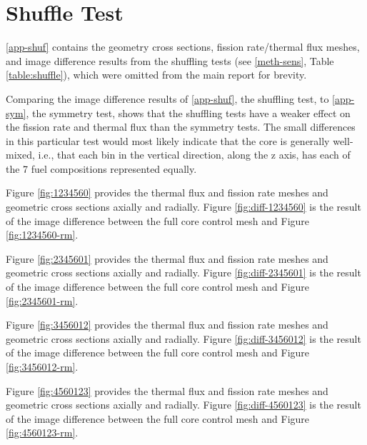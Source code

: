 \section{Shuffle Test}
\label{app-shuf}
\autoref{app-shuf} contains the geometry cross sections, fission rate/thermal flux meshes, and image difference results from the shuffling tests (see \autoref{meth-sens}, Table \ref{table:shuffle}), which were omitted from the main report for brevity.

Comparing the image difference results of \autoref{app-shuf}, the shuffling test, to \autoref{app-sym}, the symmetry test, shows that the shuffling tests have a weaker effect on the fission rate and thermal flux than the symmetry tests.  The small differences in this particular test would most likely indicate that the core is generally well-mixed, i.e., that each bin in the vertical direction, along the z axis, has each of the 7 fuel compositions represented equally.





Figure \ref{fig:1234560} provides the thermal flux and fission rate meshes and geometric cross sections axially and radially.  Figure \ref{fig:diff-1234560} is the result of the image difference between the full core control mesh and Figure \ref{fig:1234560-rm}.




Figure \ref{fig:2345601} provides the thermal flux and fission rate meshes and geometric cross sections axially and radially.  Figure \ref{fig:diff-2345601} is the result of the image difference between the full core control mesh and Figure \ref{fig:2345601-rm}.




Figure \ref{fig:3456012} provides the thermal flux and fission rate meshes and geometric cross sections axially and radially.  Figure \ref{fig:diff-3456012} is the result of the image difference between the full core control mesh and Figure \ref{fig:3456012-rm}.




Figure \ref{fig:4560123} provides the thermal flux and fission rate meshes and geometric cross sections axially and radially.  Figure \ref{fig:diff-4560123} is the result of the image difference between the full core control mesh and Figure \ref{fig:4560123-rm}.




